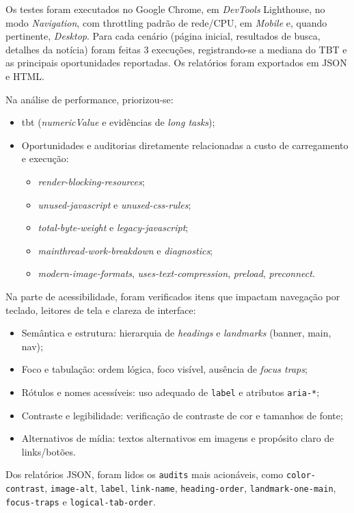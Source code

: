 Os testes foram executados no Google Chrome, em \textit{DevTools} \textrightarrow{} Lighthouse, no modo \textit{Navigation}, com throttling padrão de rede/CPU, em \textit{Mobile} e, quando pertinente, \textit{Desktop}. Para cada cenário (página inicial, resultados de busca, detalhes da notícia) foram feitas 3 execuções, registrando-se a mediana do TBT e as principais oportunidades reportadas. Os relatórios foram exportados em JSON e HTML.

Na análise de performance, priorizou-se:
\begin{itemize}
  \item \acrshort{tbt} (\textit{numericValue} e evidências de \textit{long tasks});
  \item Oportunidades e auditorias diretamente relacionadas a custo de carregamento e execução:
  \begin{itemize}
    \item \textit{render-blocking-resources};
    \item \textit{unused-javascript} e \textit{unused-css-rules};
    \item \textit{total-byte-weight} e \textit{legacy-javascript};
    \item \textit{mainthread-work-breakdown} e \textit{diagnostics};
    \item \textit{modern-image-formats}, \textit{uses-text-compression}, \textit{preload}, \textit{preconnect}.
  \end{itemize}
\end{itemize}

Na parte de acessibilidade, foram verificados itens que impactam navegação por teclado, leitores de tela e clareza de interface:
\begin{itemize}
  \item Semântica e estrutura: hierarquia de \textit{headings} e \textit{landmarks} (banner, main, nav);
  \item Foco e tabulação: ordem lógica, foco visível, ausência de \textit{focus traps};
  \item Rótulos e nomes acessíveis: uso adequado de \texttt{label} e atributos \texttt{aria-*};
  \item Contraste e legibilidade: verificação de contraste de cor e tamanhos de fonte;
  \item Alternativos de mídia: textos alternativos em imagens e propósito claro de links/botões.
\end{itemize}
Dos relatórios JSON, foram lidos os \texttt{audits} mais acionáveis, como
\texttt{color-contrast}, \texttt{image-alt}, \texttt{label}, \texttt{link-name},
\texttt{heading-order}, \texttt{landmark-one-main}, \texttt{focus-traps} e \texttt{logical-tab-order}.


